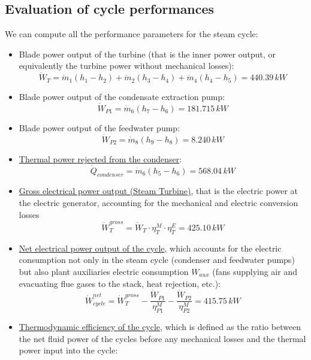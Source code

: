 \documentclass[a4paper,12pt]{article}
\newcommand{\kw}[0]{\,kW}
\begin{document}
\subsection{Evaluation of cycle performances}
We can compute all the performance parameters for the steam cycle:
\begin{itemize}
\item Blade power output of the turbine (that is the inner power output, or equivalently the turbine power without mechanical losses): 
\begin{equation}
\dot{W}_T = \dot{m}_1(h_1-h_2) + 
			\dot{m}_2(h_3-h_4) +
			\dot{m}_4(h_4-h_5) = 440.39 \kw
\end{equation}
%
\item Blade power output of the condensate extraction pump:
\begin{equation}
\dot{W}_{P1} = \dot{m}_6(h_7-h_6) = 181.715 \kw
\end{equation}
%
\item Blade power output of the feedwater pump:
\begin{equation}
\dot{W}_{P2} = \dot{m}_8(h_9-h_8) = 8.240 \kw
\end{equation}
%
\item \underline{Thermal power rejected from the condenser}:
\begin{equation}
\dot{Q}_{condenser} = \dot{m}_6(h_5-h_6) = 568.04 \kw
\end{equation}
%
\item \underline{Gross electrical power output (Steam Turbine)}, that is the electric power at the electric generator, accounting for the mechanical and electric conversion losses 
\begin{equation}
\dot{W}^{gross}_T = \dot{W}_T \cdot \eta^M_T \cdot \eta^E_T = 425.10 \kw
\end{equation}
%
\item \underline{Net electrical power output of the cycle}, which accounts for the electric consumption not only in the steam cycle (condenser and feedwater pumps) but also plant auxiliaries electric consumption $W_{aux}$ (fans supplying air and evacuating flue gases to the stack, heat rejection, etc.):  
\begin{equation}
\dot{W}^{net}_{cycle} = \dot{W}^{gross}_T - \frac{\dot{W}_{P1}}{\eta^M_{P1}} - \frac{\dot{W}_{P2}}{\eta^M_{P2}} = 415.75 \kw
\end{equation}
%
\item \underline{Thermodynamic efficiency of the cycle}, which is defined as the ratio between the net fluid power of the cycles before any mechanical losses and the thermal power input into the cycle:

\end{itemize}
\end{document}
